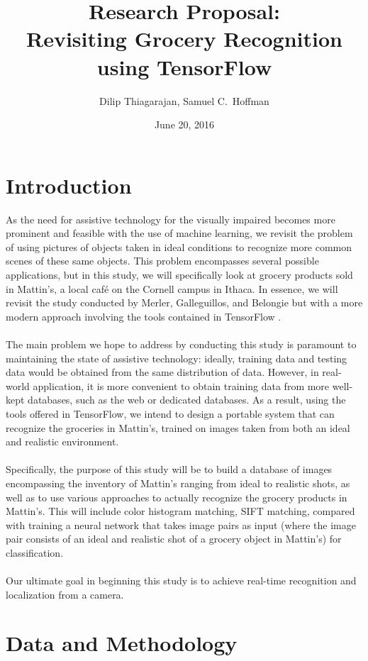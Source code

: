 \documentclass{article}
\title{Research Proposal:\\Revisiting Grocery Recognition using TensorFlow}
\author{Dilip Thiagarajan, Samuel C.\ Hoffman}
\date{June 20, 2016}
\begin{document}
\maketitle

\section{Introduction}

As the need for assistive technology for the visually impaired becomes more prominent and feasible with the use of machine learning, we revisit the problem of using pictures of objects taken in ideal conditions to recognize more common scenes of these same objects. This problem encompasses several possible applications, but in this study, we will specifically look at grocery products sold in Mattin's, a local café on the Cornell campus in Ithaca. In essence, we will revisit the study conducted by Merler, Galleguillos, and Belongie \cite{merler07} but with a more modern approach involving the tools contained in TensorFlow \cite{tensorflow15}.
\\ \\
The main problem we hope to address by conducting this study is paramount to maintaining the state of assistive technology: ideally, training data and testing data would be obtained from the same distribution of data. However, in real-world application, it is more convenient to obtain training data from more well-kept databases, such as the web or dedicated databases. As a result, using the tools offered in TensorFlow, we intend to design a portable system that can recognize the groceries in Mattin's, trained on images taken from both an ideal and realistic environment.
\\ \\
Specifically, the purpose of this study will be to build a database of images encompassing the inventory of Mattin's ranging from ideal to realistic shots, as well as to use various approaches to actually recognize the grocery products in Mattin's. This will include color histogram matching, SIFT matching, compared with training a neural network that takes image pairs as input (where the image pair consists of an ideal and realistic shot of a grocery object in Mattin's) for classification.
\\ \\
Our ultimate goal in beginning this study is to achieve real-time recognition and localization from a camera. 

\section{Data and Methodology}
\end{document}
